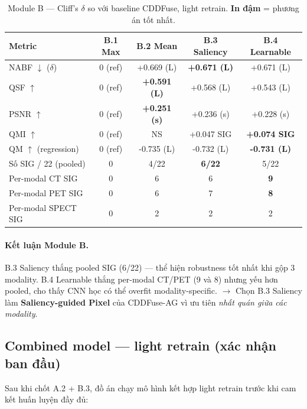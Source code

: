 \begin{table}[h]
\centering
\small
\caption{Module B --- Cliff's $\delta$ so với baseline CDDFuse, light retrain. \textbf{In đậm} = phương án tốt nhất.}
\label{tab:app-moduleB}
\begin{tabular}{lcccc}
\toprule
\textbf{Metric} & B.1 Max & B.2 Mean & B.3 Saliency & B.4 Learnable \\
\midrule
NABF $\downarrow$ ($\delta$) & 0 (ref) & +0.669 (L) & \textbf{+0.671 (L)} & +0.671 (L) \\
QSF $\uparrow$               & 0 (ref) & \textbf{+0.591 (L)} & +0.568 (L) & +0.543 (L) \\
PSNR $\uparrow$              & 0 (ref) & \textbf{+0.251 (s)} & +0.236 (s) & +0.228 (s) \\
QMI $\uparrow$               & 0 (ref) & NS         & +0.047 SIG & \textbf{+0.074 SIG} \\
QM $\uparrow$ (regression)   & 0 (ref) & -0.735 (L) & -0.732 (L) & \textbf{-0.731 (L)} \\
\midrule
Số SIG / 22 (pooled) & 0 & 4/22 & \textbf{6/22} & 5/22 \\
Per-modal CT SIG     & 0 & 6 & 6 & \textbf{9} \\
Per-modal PET SIG    & 0 & 6 & 7 & \textbf{8} \\
Per-modal SPECT SIG  & 0 & 2 & 2 & 2 \\
\bottomrule
\end{tabular}
\end{table}

\paragraph{Kết luận Module B.}
B.3 Saliency thắng pooled SIG (6/22) --- thể hiện robustness tốt nhất khi gộp 3 modality. B.4 Learnable thắng per-modal CT/PET (9 và 8) nhưng yếu hơn pooled, cho thấy CNN học có thể overfit modality-specific. $\to$ Chọn B.3 Saliency làm \textbf{Saliency-guided Pixel} của CDDFuse-AG vì ưu tiên \emph{nhất quán giữa các modality}.

\subsection{Combined model --- light retrain (xác nhận ban đầu)}
\label{app:combined-light}

Sau khi chốt A.2 + B.3, đồ án chạy mô hình kết hợp light retrain trước khi cam kết huấn luyện đầy đủ:

